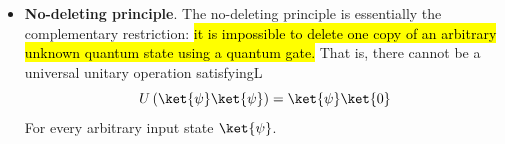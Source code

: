 \begin{itemize}
        \textbf{Note:} this does not mean that  and  cannot be copied. A CNOT gate can copy computational-basis states. What is impossible is a universal operation that clones an \textbf{arbitrary unknown superposition}

    \item \textbf{No-deleting principle}. The no-deleting principle is essentially the complementary restriction: \hl{it is impossible to delete one copy of an arbitrary unknown quantum state using a quantum gate.} That is, there cannot be a universal unitary operation satisfyingL
        \begin{equation*}
            U\left(\ket{\psi}\ket{\psi}\right) = \ket{\psi}\ket{0}
        \end{equation*}
        For every arbitrary input state $\ket{\psi}$.


\end{itemize}
